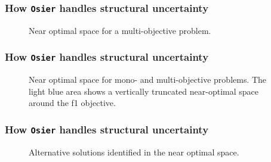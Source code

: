 \begin{frame}
    \frametitle{How \texttt{Osier} handles structural uncertainty}

        \begin{figure}
            \centering
            \resizebox{0.75\columnwidth}{!}{}
            \caption{Near optimal space for a multi-objective problem.}
            \label{fig:near-opt}
        \end{figure}
\end{frame}

\begin{frame}
    \frametitle{How \texttt{Osier} handles structural uncertainty}


        \begin{figure}
            \centering
            \resizebox{0.75\columnwidth}{!}{}
            \caption{Near optimal space for mono- and multi-objective problems. The light blue area shows
            a vertically truncated near-optimal space around the f1 objective.}
            \label{fig:near-opt-mga}
        \end{figure}

\end{frame}

\begin{frame}
    \frametitle{How \texttt{Osier} handles structural uncertainty}


        \begin{figure}
            \centering
            \resizebox{0.75\columnwidth}{!}{}
            \caption{Alternative solutions identified in the near optimal space.}
            \label{fig:nd-alt-points}
        \end{figure}

\end{frame}


